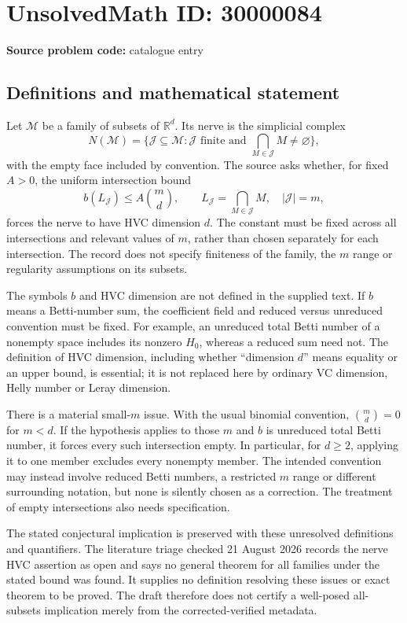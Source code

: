 \documentclass[11pt]{article}
\newcommand{\R}{\mathbb{R}}
\begin{document}
\section*{UnsolvedMath ID: 30000084}
\textbf{Source problem code:} catalogue entry
\subsection{Definitions and mathematical statement}
Let $\mathcal M$ be a family of subsets of $\R^d$. Its nerve is the simplicial complex
\[
 N(\mathcal M)=\{\mathcal J\subseteq\mathcal M:
       \mathcal J\text{ finite and }\bigcap_{M\in\mathcal J}M\ne\varnothing\},
\]
with the empty face included by convention. The source asks whether, for fixed $A>0$, the uniform intersection bound
\[
 b(L_{\mathcal J})\leq A\binom{m}{d},\qquad
 L_{\mathcal J}=\bigcap_{M\in\mathcal J}M,\quad|\mathcal J|=m,
\]
forces the nerve to have HVC dimension $d$. The constant must be fixed across all intersections and relevant values of $m$, rather than chosen separately for each intersection. The record does not specify finiteness of the family, the $m$ range or regularity assumptions on its subsets.

The symbols $b$ and HVC dimension are not defined in the supplied text. If $b$ means a Betti-number sum, the coefficient field and reduced versus unreduced convention must be fixed. For example, an unreduced total Betti number of a nonempty space includes its nonzero $H_0$, whereas a reduced sum need not. The definition of HVC dimension, including whether ``dimension $d$'' means equality or an upper bound, is essential; it is not replaced here by ordinary VC dimension, Helly number or Leray dimension.

There is a material small-$m$ issue. With the usual binomial convention, $\binom md=0$ for $m<d$. If the hypothesis applies to those $m$ and $b$ is unreduced total Betti number, it forces every such intersection empty. In particular, for $d\geq2$, applying it to one member excludes every nonempty member. The intended convention may instead involve reduced Betti numbers, a restricted $m$ range or different surrounding notation, but none is silently chosen as a correction. The treatment of empty intersections also needs specification.

The stated conjectural implication is preserved with these unresolved definitions and quantifiers. The literature triage checked 21 August 2026 records the nerve HVC assertion as open and says no general theorem for all families under the stated bound was found. It supplies no definition resolving these issues or exact theorem to be proved. The draft therefore does not certify a well-posed all-subsets implication merely from the corrected-verified metadata.
\end{document}
